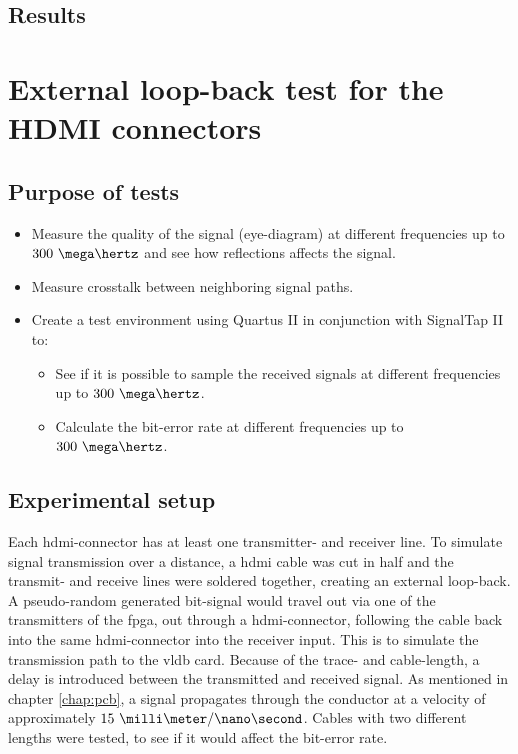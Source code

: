\documentclass[main.tex]{subfiles}
\begin{document}
\subsection{Results}


\section{External loop-back test for the HDMI connectors}


\subsection{Purpose of tests}

\begin{itemize}\setlength{\itemsep}{10pt}
\item Measure the quality of the signal (eye-diagram) at different frequencies up to $300~\mega\hertz$ and see how reflections affects the signal.
\item Measure crosstalk between neighboring signal paths.
\item Create a test environment using Quartus II in conjunction with SignalTap II to:
\begin{itemize}\setlength{\itemsep}{10pt}
  \item See if it is possible to sample the received signals at different frequencies up to $300~\mega\hertz$.
  \item Calculate the bit-error rate at different frequencies up to $300~\mega\hertz$.
\end{itemize}
\end{itemize}

\subsection{Experimental setup}

Each \gls{hdmi}-connector has at least one transmitter- and receiver line. To simulate signal transmission over a distance, a \gls{hdmi} cable was cut in half and the transmit- and receive lines were soldered together, creating an external loop-back. A pseudo-random generated bit-signal would travel out via one of the transmitters of the \gls{fpga}, out through a \gls{hdmi}-connector, following the cable back into the same \gls{hdmi}-connector into the receiver input. This is to simulate the transmission path to the \gls{vldb} card. Because of the trace- and cable-length, a delay is introduced between the transmitted and received signal. As mentioned in chapter \ref{chap:pcb}, a signal propagates through the conductor at a velocity of approximately $15\ \milli\meter/\nano\second$. Cables with two different lengths were tested, to see if it would affect the bit-error rate.
\end{document}
